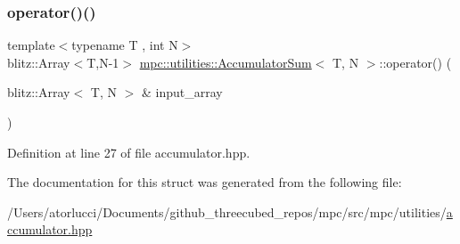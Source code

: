 \subsubsection{\texorpdfstring{operator()()}{operator()()}}
{\footnotesize\ttfamily template$<$typename T , int N$>$ \\
blitz\+::\+Array$<$T,N-\/1$>$ \mbox{\hyperlink{structmpc_1_1utilities_1_1_accumulator_sum}{mpc\+::utilities\+::\+Accumulator\+Sum}}$<$ T, N $>$\+::operator() (\begin{DoxyParamCaption}\item[{blitz\+::\+Array$<$ T, N $>$ \&}]{input\+\_\+array }\end{DoxyParamCaption})\hspace{0.3cm}{\ttfamily [inline]}}



Definition at line 27 of file accumulator.\+hpp.



The documentation for this struct was generated from the following file\+:\begin{DoxyCompactItemize}
\item 
/\+Users/atorlucci/\+Documents/github\+\_\+threecubed\+\_\+repos/mpc/src/mpc/utilities/\mbox{\hyperlink{accumulator_8hpp}{accumulator.\+hpp}}\end{DoxyCompactItemize}
